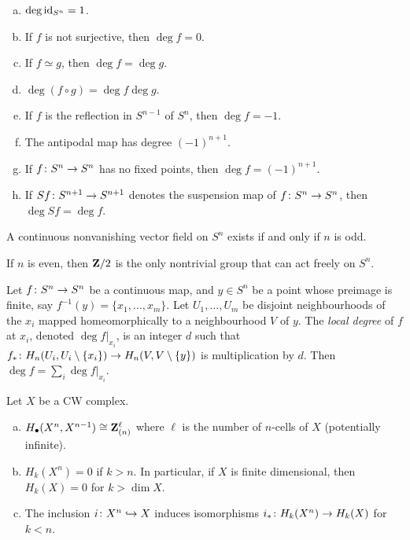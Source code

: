\begin{proposition}
  \mbox{}
  \begin{enumerate}[(a)]
  \item $\deg \operatorname{id}_{S^n} = 1$.
  \item If $f$ is not surjective, then $\deg f = 0$.
  \item If $f \simeq g$, then $\deg f = \deg g$.
  \item $\deg (f \circ g) = \deg f \deg g$.
  \item If $f$ is the reflection in $S^{n-1}$ of $S^n$, then $\deg f = -1$.
  \item The antipodal map has degree $(-1)^{n+1}$.
  \item If $f \colon S^n \rightarrow S^n$ has no fixed points, then $\deg f = (-1)^{n+1}$.
  \item If $S f \colon S^{n+1} \rightarrow S^{n+1}$ denotes the suspension map of $f \colon S^n \rightarrow S^n$, then $\deg S f = \deg f$.
  \end{enumerate}
\end{proposition}

\begin{theorem}
  A continuous nonvanishing vector field on $S^n$ exists if and only if $n$ is odd.
\end{theorem}

\begin{proposition}
  If $n$ is even, then $\mathbf{Z}/2$ is the only nontrivial group that can act freely on $S^n$.
\end{proposition}

\begin{proposition}
  Let $f \colon S^n \rightarrow S^n$ be a continuous map, and $y \in S^n$ be a point whose preimage is finite, say $f^{-1}(y) = \{ x_1, \dots, x_m \}$. Let $U_1, \dots, U_m$ be disjoint neighbourhoods of the $x_i$ mapped homeomorphically to a neighbourhood $V$ of $y$. The \emph{local degree} of $f$ at $x_i$, denoted $\deg f|_{x_i}$, is an integer $d$ such that $f_\ast \colon H_n(U_i, U_i \setminus \{x_i\}) \rightarrow H_n(V, V \setminus \{y\})$ is multiplication by $d$. Then $\deg f = \sum_i \deg f|_{x_i}$.
\end{proposition}

\begin{proposition}
  Let $X$ be a CW complex.
  \begin{enumerate}[(a)]
  \item $H_\bullet(X^n,X^{n-1}) \cong \mathbf{Z}^\ell_{(n)}$ where $\ell$ is the number of $n$-cells of $X$ (potentially infinite).
  \item $H_k(X^n) = 0$ if $k > n$. In particular, if $X$ is finite dimensional, then $H_k(X) = 0$ for $k > \dim X$.
  \item The inclusion $i \colon X^n \hookrightarrow X$ induces isomorphisms $i_\ast \colon H_k(X^n) \rightarrow H_k(X)$ for $k < n$.
  \end{enumerate}
\end{proposition}

